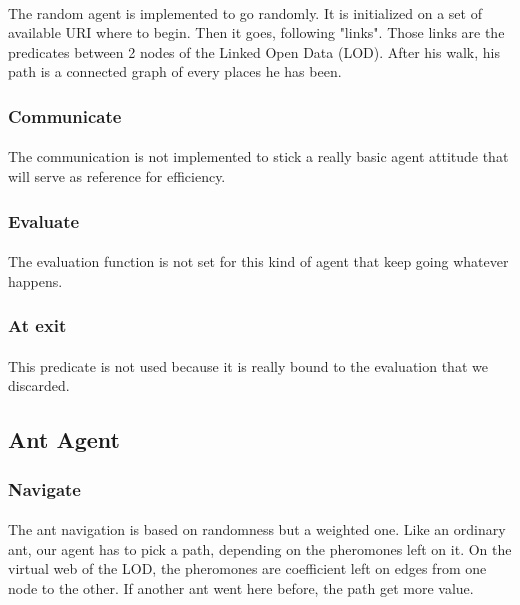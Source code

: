 \documentclass{article}
\begin{document}
			\paragraph{}
				The random agent is implemented to go randomly.
				It is initialized on a set of available URI where to begin.
				Then it goes, following "links".
				Those links are the predicates between 2 nodes of the Linked Open Data (LOD).
				After his walk, his path is a connected graph of every places he has been.
		\subsubsection{Communicate}
			\paragraph{}
				The communication is not implemented to stick a really basic agent attitude that will serve as reference for efficiency.
		\subsubsection{Evaluate}
			\paragraph{}
				The evaluation function is not set for this kind of agent that keep going whatever happens.
		\subsubsection{At exit}
			\paragraph{}
				This predicate is not used because it is really bound to the evaluation that we discarded.
	\subsection{Ant Agent}
		\subsubsection{Navigate}
			\paragraph{}
				The ant navigation is based on randomness but a weighted one.
				Like an ordinary ant, our agent has to pick a path, depending on the pheromones left on it.
				On the virtual web of the LOD, the pheromones are coefficient left on edges from one node to the other.
				If another ant went here before, the path get more value.
\end{document}
